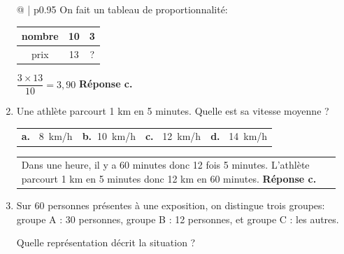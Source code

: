 \begin{enumerate}
\medskip

\begin{tabular}{@{\hspace{0.03\linewidth}} | p{0.95\linewidth}}
On fait un tableau de proportionnalité:
\begin{tabular}{|c|c|c|}
\hline
nombre & 10 & 3\\
\hline
prix & 13 & ?\\
\hline
\end{tabular}

$\dfrac{3\times 13}{10}=3,90$
\hfill\textbf{Réponse c.}
\end{tabular}

\bigskip

\item Une athlète parcourt 1 km en 5 minutes. Quelle est sa vitesse moyenne ?

\begin{tabularx}{\linewidth}{*{4}{X}}
\textbf{a.~} 8~km/h &\textbf{b.~}10~km/h&\textbf{c.~} 12~km/h&\textbf{d.~} 14~km/h
\end{tabularx}

\medskip

\begin{tabular}{@{\hspace{0.03\linewidth}} | p{0.95\linewidth}}
Dans une heure, il y a 60 minutes donc 12 fois 5 minutes.
L'athlète parcourt 1 km en 5 minutes donc 12 km en 60 minutes.
\hfill\textbf{Réponse c.}
\end{tabular}

\bigskip

\item Sur 60 personnes présentes à une exposition, on distingue trois groupes:\\
 groupe A : 30 personnes,  groupe B : 12 personnes, et  groupe C : les autres.

Quelle représentation décrit la situation ?


\end{enumerate}
